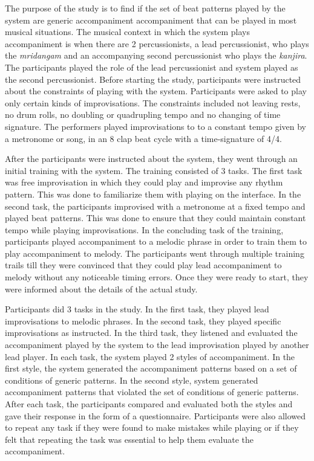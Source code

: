 

The purpose of the study is to find if the set of beat patterns played by the system are generic accompaniment accompaniment that can be played in most musical situations. The musical context in which the system plays accompaniment is when there are 2 percussionists, a lead percussionist, who plays the \emph{mridangam} and an accompanying second percussionist who plays the \emph{kanjira}. The participants played the role of the lead percussionist and system played as the second percussionist. Before starting the study, participants were instructed about the constraints of playing with the system. Participants were asked to play only certain kinds of improvisations. The constraints included not leaving rests, no drum rolls, no doubling or quadrupling tempo and no changing of time signature. The performers played improvisations to to a constant tempo given by a metronome or song, in an 8 clap beat cycle with a time-signature of 4/4. 

After the participants were instructed about the system, they went through an initial training with the system. The training consisted of 3 tasks. The first task was free improvisation in which they could play and improvise any rhythm pattern. This was done to familiarize them with playing on the interface. In the second task, the participants improvised with a metronome at a fixed tempo and played beat patterns. This was done to ensure that they could maintain constant tempo while playing improvisations. In the concluding task of the training, participants played accompaniment to a melodic phrase in order to train them to play accompaniment to melody. The participants went through multiple training trails till they were convinced that they could play lead accompaniment to melody without any noticeable timing errors. Once they were ready to start, they were informed about the details of the actual study. 

Participants did 3 tasks in the study. In the first task, they played lead improvisations to melodic phrases. In the second task, they played specific improvisations as instructed. In the third task, they listened and evaluated the accompaniment played by the system to the lead improvisation played by another lead player. In each task, the system played 2 styles of accompaniment. In the first style, the system generated the accompaniment patterns based on a set of conditions of generic patterns. In the second style, system generated accompaniment patterns that violated the set of conditions of generic patterns. After each task, the participants compared and evaluated both the styles and gave their response in the form of a questionnaire. Participants were also allowed to repeat any task if they were found to make mistakes while playing or if they felt that repeating the task was essential to help them evaluate the accompaniment. 


